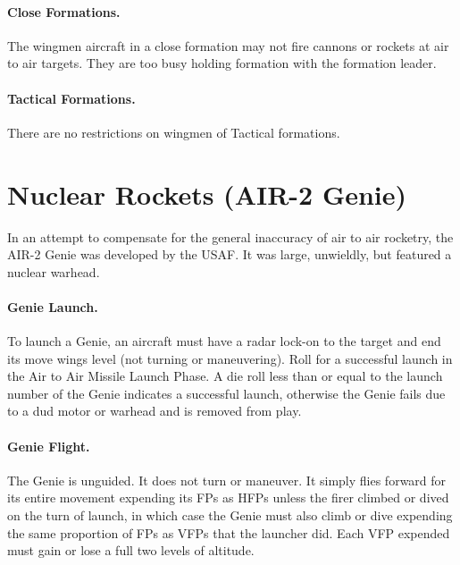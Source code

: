 \begin{advancedrules}
\paragraph{Close Formations.} The wingmen aircraft in a close formation may not fire cannons or rockets at air to air targets. They are too busy holding formation with the formation leader.

\paragraph{Tactical Formations.} There are no restrictions on wingmen of Tactical formations.


\section{Nuclear Rockets (AIR-2 Genie)}
\label{rule:air-to-air-nuclear-rockets}
\label{rule:genie}


In an attempt to compensate for the general inaccuracy of air to air rocketry, the AIR-2 Genie was developed by the USAF. It was large, unwieldly, but featured a nuclear warhead.

\paragraph{Genie Launch.} To launch a Genie, an aircraft must have a radar lock-on to the target and end its move wings level (not turning or maneuvering). Roll for a successful launch in the Air to Air Missile Launch Phase. A die roll less than or equal to the launch number of the Genie indicates a successful launch, otherwise the Genie fails due to a dud motor or warhead and is removed from play.

\paragraph{Genie Flight.} The Genie is unguided. It does not turn or maneuver. It simply flies forward for its entire movement expending its FPs as HFPs unless the firer climbed or dived on the turn of launch, in which case the Genie must also climb or dive expending the same proportion of FPs as VFPs that the launcher did. Each VFP expended must gain or lose a full two levels of altitude.


\end{advancedrules}
